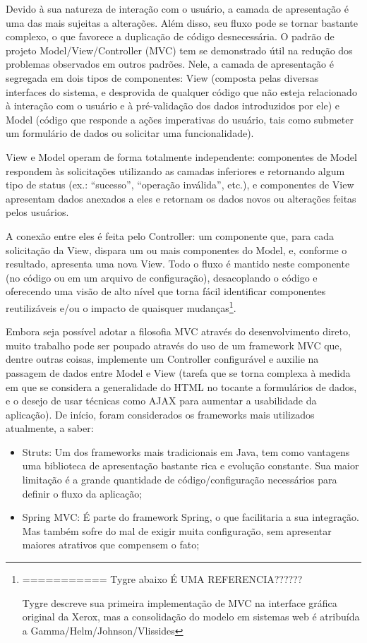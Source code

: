 \documentclass{abnt}
\begin{document}
	Devido à sua natureza de interação com o usuário, a camada de apresentação é uma das mais sujeitas a alterações. Além disso, seu fluxo pode se tornar bastante complexo, o que favorece a duplicação de código desnecessária. O padrão de projeto Model/View/Controller (MVC) tem se demonstrado útil na redução dos problemas observados em outros padrões. Nele, a camada de apresentação é segregada em dois tipos de componentes: View (composta pelas diversas interfaces do sistema, e desprovida de qualquer código que não esteja relacionado à interação com o usuário e à pré-validação dos dados introduzidos por ele) e Model (código que responde a ações imperativas do usuário, tais como submeter um formulário de dados ou solicitar uma funcionalidade).

	View e Model operam de forma totalmente independente: componentes de Model respondem às solicitações utilizando as camadas inferiores e retornando algum tipo de status (ex.: “sucesso”, “operação inválida”, etc.), e componentes de View apresentam dados anexados a eles e retornam os dados novos ou alterações feitas pelos usuários.

	A conexão entre eles é feita pelo Controller: um componente que, para cada solicitação da View, dispara um ou mais componentes do Model, e, conforme o resultado, apresenta uma nova View. Todo o fluxo é mantido neste componente (no código ou em um arquivo de configuração), desacoplando o código e oferecendo uma visão de alto nível que torna fácil identificar componentes reutilizáveis e/ou o impacto de quaisquer mudanças\footnote{
	
===========	Tygre abaixo É UMA REFERENCIA??????
	
	
	Tygre descreve sua primeira implementação de MVC na interface gráfica original da Xerox, mas a consolidação do modelo em sistemas web é atribuída a Gamma/Helm/Johnson/Vlissides\cite{Gamma1995}}.

	Embora seja possível adotar a filosofia MVC através do desenvolvimento direto, muito trabalho pode ser poupado através do uso de um framework MVC que, dentre outras coisas, implemente um Controller configurável e auxilie na passagem de dados entre Model e View (tarefa que se torna complexa à medida em que se considera a generalidade do HTML no tocante a formulários de dados, e o desejo de usar técnicas como AJAX para aumentar a usabilidade da aplicação). De início, foram considerados os frameworks mais utilizados atualmente, a saber:

\begin{itemize}
\item Struts: Um dos frameworks mais tradicionais em Java, tem como vantagens uma biblioteca de apresentação bastante rica e evolução constante. Sua maior limitação é a grande quantidade de código/configuração necessários para definir o fluxo da aplicação;
\item Spring MVC: É parte do framework Spring, o que facilitaria a sua integração. Mas também sofre do mal de exigir muita configuração, sem apresentar maiores atrativos que compensem o fato;
\end{itemize}
\end{document}
